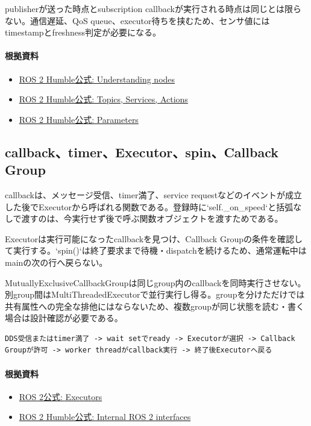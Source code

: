 \documentclass[a4paper,11pt]{article}
\begin{document}
publisherが送った時点とsubscription callbackが実行される時点は同じとは限らない。通信遅延、QoS queue、executor待ちを挟むため、センサ値にはtimestampとfreshness判定が必要になる。

\paragraph{根拠資料}
\begin{itemize}[leftmargin=1.6em]
\item \href{https://docs.ros.org/en/humble/Tutorials/Beginner-CLI-Tools/Understanding-ROS2-Nodes/Understanding-ROS2-Nodes.html}{ROS 2 Humble公式: Understanding nodes}
\item \href{https://docs.ros.org/en/humble/Concepts/Basic/Interfaces-Topics-Services-Actions.html}{ROS 2 Humble公式: Topics, Services, Actions}
\item \href{https://docs.ros.org/en/humble/Concepts/Basic/About-Parameters.html}{ROS 2 Humble公式: Parameters}
\end{itemize}

\subsection{callback、timer、Executor、spin、Callback Group}
callbackは、メッセージ受信、timer満了、service requestなどのイベントが成立した後でExecutorから呼ばれる関数である。登録時に`self.\_on\_speed`と括弧なしで渡すのは、今実行せず後で呼ぶ関数オブジェクトを渡すためである。


Executorは実行可能になったcallbackを見つけ、Callback Groupの条件を確認して実行する。`spin()`は終了要求まで待機・dispatchを続けるため、通常運転中はmainの次の行へ戻らない。


MutuallyExclusiveCallbackGroupは同じgroup内のcallbackを同時実行させない。別group間はMultiThreadedExecutorで並行実行し得る。groupを分けただけでは共有属性への完全な排他にはならないため、複数groupが同じ状態を読む・書く場合は設計確認が必要である。


\begin{lstlisting}
DDS受信またはtimer満了 -> wait setでready -> Executorが選択 -> Callback Groupが許可 -> worker threadがcallback実行 -> 終了後Executorへ戻る
\end{lstlisting}

\paragraph{根拠資料}
\begin{itemize}[leftmargin=1.6em]
\item \href{https://docs.ros.org/en/rolling/Concepts/Intermediate/About-Executors.html}{ROS 2公式: Executors}
\item \href{https://docs.ros.org/en/humble/Concepts/About-Internal-Interfaces.html}{ROS 2 Humble公式: Internal ROS 2 interfaces}
\end{itemize}
\end{document}
